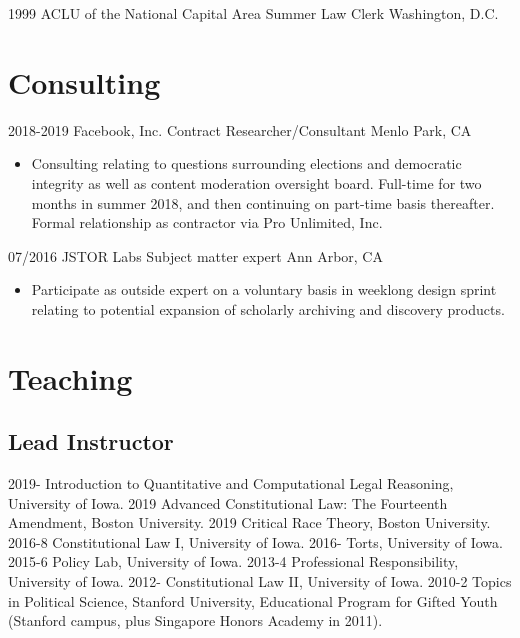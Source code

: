 \documentclass[letterpaper]{moderncv}
\begin{document}
\cventry
{1999}
{ACLU of the National Capital Area}
{Summer Law Clerk}
{Washington, D.C.}
{}
{}


\section{Consulting}

\cventry
{2018-2019}
{Facebook, Inc.}
{Contract Researcher/Consultant}
{Menlo Park, CA}
{}
{\begin{itemize}%
	\item Consulting relating to questions surrounding elections and democratic
    integrity as well as content moderation oversight board.
    Full-time for two months in summer 2018, and then continuing on
    part-time basis thereafter. Formal relationship
    as contractor via Pro Unlimited, Inc.
	\end{itemize}}

\cventry
{07/2016}
{JSTOR Labs}
{Subject matter expert}
{Ann Arbor, CA}
{}
{\begin{itemize}%
	\item Participate as outside expert on a voluntary basis in weeklong design
    sprint relating to potential expansion of scholarly archiving and discovery products.
	\end{itemize}}

\section{Teaching}
\subsection{Lead Instructor}
\cvitem
{2019-}
{Introduction to Quantitative and Computational Legal Reasoning, University of Iowa.}
\vspace{1mm}
\cvitem
{2019}
{Advanced Constitutional Law: The Fourteenth Amendment, Boston University.}
\vspace{1mm}
\cvitem
{2019}
{Critical Race Theory, Boston University.}
\vspace{1mm}
\cvitem
{2016-8}
{Constitutional Law I, University of Iowa.}
\vspace{1mm}
\cvitem
{2016-}
{Torts, University of Iowa.}
\vspace{1mm}
\cvitem
{2015-6}
{Policy Lab, University of Iowa.}
\vspace{1mm}
\cvitem
{2013-4}
{Professional Responsibility, University of Iowa.}
\vspace{1mm}
\cvitem
{2012-}
{Constitutional Law II, University of Iowa.}
\vspace{1mm}
\cvitem
{2010-2}
{Topics in Political Science, Stanford University, Educational Program for Gifted Youth (Stanford campus, plus Singapore Honors Academy in 2011).}
\vspace{1mm}
\end{document}
